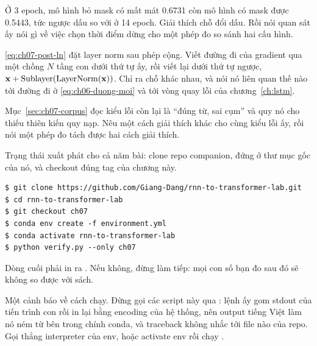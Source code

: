 \begin{bt}
  \item Ở 3 epoch, mô hình bỏ mask có mất mát 0.6731 còn mô hình có mask được
    0.5443, tức ngược dấu so với ở 14 epoch. Giải thích chỗ đổi dấu. Rồi nói
    quan sát ấy nói gì về việc chọn thời điểm dừng cho một phép đo so sánh
    hai cấu hình.

  \item \eqref{eq:ch07-post-ln} đặt layer norm sau phép cộng. Viết đường đi của
    gradient qua một chồng \(N\) tầng con dưới thứ tự ấy, rồi viết lại dưới thứ
    tự ngược, \(\mathbf{x} + \mathrm{Sublayer}(\operatorname{LayerNorm}(\mathbf{x}))\). Chỉ ra
    chỗ khác nhau, và nói nó liên quan thế nào tới đường đi ở
    \eqref{eq:ch06-duong-moi} và tới vòng quay lỗi của
    chương~\ref{ch:lstm}.

  \item Mục~\ref{sec:ch07-corpus} đọc kiểu lỗi còn lại là \enquote{đúng từ, sai
    cụm} và quy nó cho thiếu thiên kiến quy nạp. Nêu một cách giải thích khác
    cho cùng kiểu lỗi ấy, rồi nói một phép đo tách được hai cách giải thích.
\end{bt}

\tierapply

Trạng thái xuất phát cho cả năm bài: clone repo companion, đứng ở thư mục gốc
của nó, và checkout đúng tag của chương này.

\begin{verbatim}
$ git clone https://github.com/Giang-Dang/rnn-to-transformer-lab.git
$ cd rnn-to-transformer-lab
$ git checkout ch07
$ conda env create -f environment.yml
$ conda activate rnn-to-transformer-lab
$ python verify.py --only ch07
\end{verbatim}

Dòng cuối phải in ra . Nếu không, đừng làm tiếp: mọi con số bạn
đo sau đó sẽ không so được với sách.

Một cảnh báo về cách chạy. Đừng gọi các script này
qua : lệnh ấy gom stdout của tiến trình con rồi in lại bằng
encoding của hệ thống, nên output tiếng Việt làm nó ném
 từ bên trong chính conda, và traceback không nhắc tới
file nào của repo. Gọi thẳng interpreter của env, hoặc activate env rồi chạy
.

